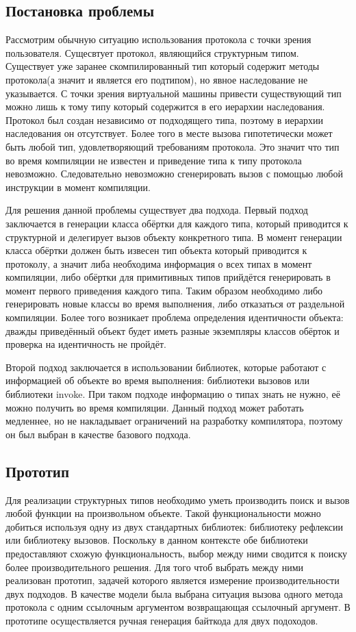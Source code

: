
\subsection{Постановка проблемы}

Рассмотрим обычную ситуацию использования протокола с точки зрения пользователя. Сущесвтует протокол, являющийся структурным типом. Существует уже заранее скомпилированный тип который содержит методы протокола(а значит и является его подтипом), но явное наследование не указывается. С точки зрения виртуальной машины привести существующий тип можно лишь к тому типу который содержится в его иерархии наследования. Протокол был создан независимо от подходящего типа, поэтому в иерархии наследования он отсутствует. Более того в месте вызова гипотетически может быть любой тип, удовлетворяющий требованиям протокола. Это значит что тип во время компиляции не известен и приведение типа к типу протокола невозможно. Следовательно невозможно сгенерировать вызов с помощью любой инструкции в момент компиляции.

Для решения данной проблемы существует два подхода. Первый подход заключается в генерации класса обёртки для каждого типа, который приводится к структурной и делегирует вызов объекту конкретного типа. В момент генерации класса обёртки должен быть извесен тип объекта который приводится к протоколу, а значит либа необходима информация о всех типах в момент компиляции, либо обёртки для примитивных типов прийдётся генерировать в момент первого приведения каждого типа. Таким образом необходимо либо генерировать новые классы во время выполнения, либо отказаться от раздельной компиляции. Более того возникает проблема определения идентичности объекта: дважды приведённый объект будет иметь разные экземпляры классов обёрток и проверка на идентичность не пройдёт.

Второй подход заключается в использовании библиотек, которые работают с информацией об объекте во время выполнения: библиотеки вызовов или библиотеки invoke. При таком подходе информацию о типах знать не нужно, её можно получить во время компиляции. Данный подход может работать медленнее, но не накладывает ограничений на разработку компилятора, поэтому он был выбран в качестве базового подхода.

\subsection{Прототип}
Для реализации структурных типов необходимо уметь производить поиск и вызов любой функции на произвольном объекте. Такой функциональности можно добиться используя одну из двух стандартных библиотек: библиотеку рефлексии или библиотеку вызовов. Поскольку в данном контексте обе библиотеки предоставляют схожую функциональность, выбор между ними сводится к поиску более производительного решения. Для того чтоб выбрать между ними реализован прототип, задачей которого является измерение производительности двух подходов. В качестве модели была выбрана ситуация вызова одного метода протокола с одним ссылочным аргументом возвращающая ссылочный аргумент. В прототипе осуществляется ручная генерация байткода для двух подоходов.

